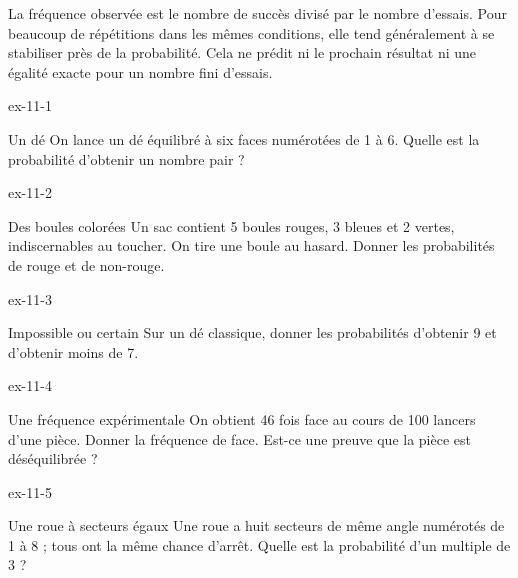 \begin{propriete}La fréquence observée est le nombre de succès divisé par le nombre d’essais. Pour beaucoup de répétitions dans les mêmes conditions, elle tend généralement à se stabiliser près de la probabilité. Cela ne prédit ni le prochain résultat ni une égalité exacte pour un nombre fini d’essais.\end{propriete}
\clearpage{}
\begin{blocLivre}{ex-11-1}\begin{exercice}[1]{Un dé}
On lance un dé équilibré à six faces numérotées de 1 à 6. Quelle est la probabilité d’obtenir un nombre pair ?
\end{exercice}\end{blocLivre}
\begin{blocLivre}{ex-11-2}\begin{exercice}[1]{Des boules colorées}
Un sac contient 5 boules rouges, 3 bleues et 2 vertes, indiscernables au toucher. On tire une boule au hasard. Donner les probabilités de rouge et de non-rouge.
\end{exercice}\end{blocLivre}
\begin{blocLivre}{ex-11-3}\begin{exercice}[1]{Impossible ou certain}
Sur un dé classique, donner les probabilités d’obtenir 9 et d’obtenir moins de 7.
\end{exercice}\end{blocLivre}
\begin{blocLivre}{ex-11-4}\begin{exercice}[1]{Une fréquence expérimentale}
On obtient 46 fois face au cours de 100 lancers d’une pièce. Donner la fréquence de face. Est-ce une preuve que la pièce est déséquilibrée ?
\end{exercice}\end{blocLivre}
\begin{blocLivre}{ex-11-5}\begin{exercice}[1]{Une roue à secteurs égaux}
Une roue a huit secteurs de même angle numérotés de 1 à 8 ; tous ont la même chance d’arrêt. Quelle est la probabilité d’un multiple de 3 ?
\end{exercice}\end{blocLivre}

